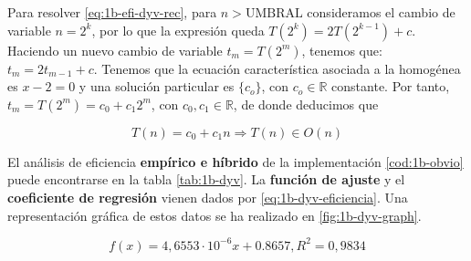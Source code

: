 Para resolver \ref{eq:1b-efi-dyv-rec}, para $n > \text{UMBRAL}$
consideramos el cambio
de variable $n = 2^k$, por lo que la expresión queda $T(2^k) = 2T(2^{k-1}) + c$. Haciendo
un nuevo cambio de variable $t_m = T(2^m)$, tenemos que:
$t_m = 2 t_{m-1} + c$. Tenemos que la ecuación característica
asociada a la homogénea es $x-2 = 0$ y una solución particular 
es $\{c_o\}$, con $c_o \in \mathbb R$ constante. Por tanto, $t_m = T(2^m) = c_0 + c_1 2^m$,
con $c_0, c_1 \in \mathbb R$, de donde deducimos que 

\begin{equation}
    T(n) = c_0 + c_1 n \Rightarrow \boxed{T(n) \in O(n)}
\end{equation}

El análisis de eficiencia \textbf{empírico e híbrido}
de la implementación \ref{cod:1b-obvio} puede encontrarse en la tabla \ref{tab:1b-dyv}. La 
\textbf{función de ajuste} y el \textbf{coeficiente de regresión} vienen dados 
por \ref{eq:1b-dyv-eficiencia}. Una representación gráfica de estos datos se ha realizado en
\ref{fig:1b-dyv-graph}. 

\begin{equation}
    \boxed{f(x) = 4,6553 \cdot 10^{-6} x + 0.8657, R^2 = 0,9834}
    \label{eq:1b-dyv-eficiencia}
\end{equation}

